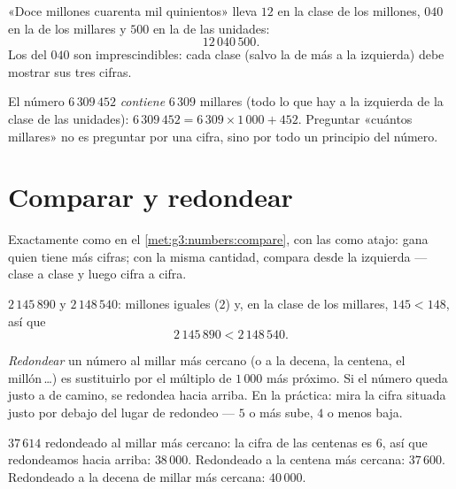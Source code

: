 \begin{example}\label{ex:g4:numbers:write}
«Doce millones cuarenta mil quinientos» lleva $12$ en la
clase de los millones, $040$ en la de los millares y $500$ en la de las
unidades:
\[
12\,040\,500 .
\]
Los  del $040$ son imprescindibles: cada clase (salvo la de más a la izquierda)
debe mostrar sus tres cifras.
\end{example}

\begin{example}\label{ex:g4:numbers:contained}
El número $6\,309\,452$ \emph{contiene} $6\,309$ millares
(todo lo que hay a la izquierda de la clase de las unidades): $6\,309\,452 = 6\,309 \times
1\,000 + 452$. Preguntar «cuántos millares» no es preguntar por una
cifra, sino por todo un principio del número.
\end{example}

\section{Comparar y redondear}

\begin{method}\label{met:g4:numbers:compare}
Exactamente como en el \cref{met:g3:numbers:compare}, con las  como
atajo: gana quien tiene más cifras; con la misma cantidad, compara desde la izquierda ---
clase a clase y luego cifra a cifra.
\end{method}

\begin{example}\label{ex:g4:numbers:compare}
$2\,145\,890$ y $2\,148\,540$: millones iguales ($2$) y, en la clase de los millares,
$145 < 148$, así que
\[
2\,145\,890 < 2\,148\,540 .
\]
\end{example}

\begin{definition}[Redondear]\label{def:g4:numbers:round}
\emph{Redondear} un número al millar más cercano
(o a la decena, la centena, el millón\,\dots) es sustituirlo por el múltiplo
de $1\,000$ más próximo. Si el número queda justo a  de camino, se redondea hacia arriba. En
la práctica: mira la cifra situada justo por debajo del lugar de redondeo --- $5$ o
más sube, $4$ o menos baja.
\end{definition}

\begin{example}\label{ex:g4:numbers:round}
$37\,614$ redondeado al millar más cercano: la cifra de las centenas es
$6$, así que redondeamos hacia arriba: $38\,000$. Redondeado a la centena más cercana:
$37\,600$. Redondeado a la decena de millar más cercana: $40\,000$.
\end{example}


